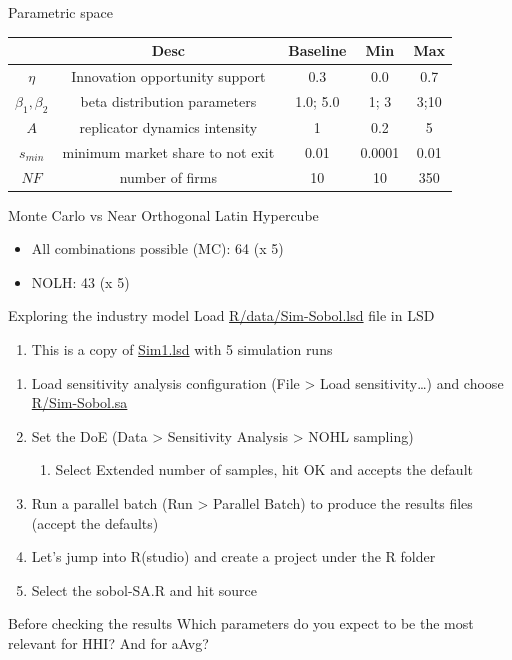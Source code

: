 \documentclass[bigger,aspectratio=169]{beamer}
\begin{document}
\begin{frame}[label={sec:orgbb8a68b}]{Parametric space}
\begin{center}
\begin{tabular}{ccccc}
\hline
 & Desc & Baseline & Min & Max\\
\hline
\(\eta\) & Innovation opportunity support & 0.3 & 0.0 & 0.7\\
\(\beta_{1}, \beta_{2}\) & beta distribution parameters & 1.0; 5.0 & 1; 3 & 3;10\\
\(A\) & replicator dynamics intensity & 1 & 0.2 & 5\\
\(s_{min}\) & minimum market share to not exit & 0.01 & 0.0001 & 0.01\\
\(NF\) & number of firms & 10 & 10 & 350\\
\hline
\end{tabular}
\end{center}
\begin{block}{Monte Carlo vs Near Orthogonal Latin Hypercube}
\begin{itemize}
\item All combinations possible (MC): 64 (x 5)
\item NOLH: 43 (x 5)
\end{itemize}
\end{block}
\end{frame}
\begin{frame}[label={sec:orgc613acb}]{Exploring the industry model}
Load \href{Industry\_SummerSchool/R/data/Sim-Sobol.lsd}{R/data/Sim-Sobol.lsd} file in LSD
\begin{enumerate}
\item This is a copy of \href{Industry\_SummerSchool/Sim1.lsd}{Sim1.lsd} with 5 simulation runs
\end{enumerate}
\begin{enumerate}
\item Load sensitivity analysis configuration (\alert{File > Load sensitivity\ldots{}}) and choose \href{Industry\_SummerSchool/R/Sim-Sobol.sa}{R/Sim-Sobol.sa}
\item Set the DoE (\alert{Data > Sensitivity Analysis > NOHL sampling})
\begin{enumerate}
\item Select \alert{Extended number of samples}, hit \alert{OK} and accepts the default
\end{enumerate}
\item Run a \alert{parallel batch} (Run > Parallel Batch) to produce the results files (accept the defaults)
\item Let's jump into R(studio) and create a project under the \alert{R} folder
\item Select the \alert{sobol-SA.R} and hit source
\end{enumerate}
\begin{block}{Before checking the results}
Which parameters do you expect to be the most relevant for \alert{HHI}? And for \alert{aAvg}?
\end{block}
\end{frame}
\end{document}
